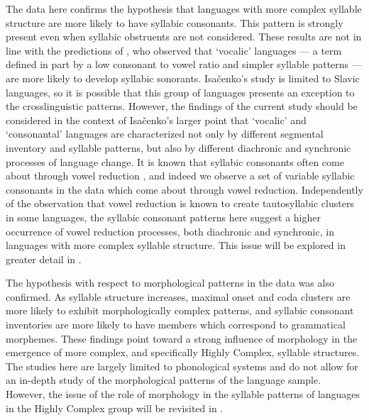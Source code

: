   The data here confirms the hypothesis that languages with more complex syllable structure are more likely to have syllabic consonants. This pattern is strongly present even when syllabic obstruents are not considered. These results are not in line with the predictions of \citet{Isačenko1939/1940}, who observed that ‘vocalic’ languages — a term defined in part by a low consonant to vowel ratio and simpler syllable patterns — are more likely to develop syllabic sonorants. Isačenko’s study is limited to Slavic languages, so it is possible that this group of languages presents an exception to the crosslinguistic patterns. However, the findings of the current study should be considered in the context of Isačenko’s larger point that ‘vocalic’ and ‘consonantal’ languages are characterized not only by different segmental inventory and syllable patterns, but also by different diachronic and synchronic processes of language change. It is known that syllabic consonants often come about through vowel reduction \citep{Bell1978a}, and indeed we observe a set of variable syllabic consonants in the data which come about through vowel reduction. Independently of the observation that vowel reduction is known to create tautosyllabic clusters in some languages, the syllabic consonant patterns here suggest a higher occurrence of vowel reduction processes, both diachronic and synchronic, in languages with more complex syllable structure. This issue will be explored in greater detail in .

  The hypothesis with respect to morphological patterns in the data was also confirmed. As syllable structure increases, maximal onset and coda clusters are more likely to exhibit morphologically complex patterns, and syllabic consonant inventories are more likely to have members which correspond to grammatical morphemes. These findings point toward a strong influence of morphology in the emergence of more complex, and specifically Highly Complex, syllable structures. The studies here are largely limited to phonological systems and do not allow for an in-depth study of the morphological patterns of the language sample. However, the issue of the role of morphology in the syllable patterns of languages in the Highly Complex group will be revisited in .


